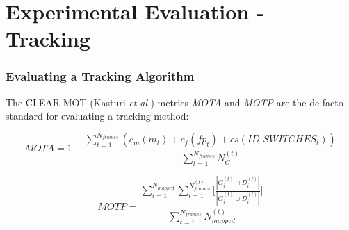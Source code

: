 \section{Experimental Evaluation - Tracking}

\begin{frame}
	\frametitle{Evaluating a Tracking Algorithm}
	
	\Large
	
	\vspace{0.3cm}
	
	The CLEAR MOT (Kasturi \emph{et al.}) metrics \emph{MOTA} and \emph{MOTP} are the de-facto
	standard for evaluating a tracking method:
	
	\vspace{0.2cm}
	
	\large
	
	\begin{equation*}
		MOTA = 1 - \frac{\sum_{t=1}^{N_{frames}} (c_m(m_t) + c_f(fp_t) + cs(ID\mbox{-}SWITCHES_t))}{\sum_{t=1}^{N_{frames}} N_G^{(t)}}
	\end{equation*}
	
	\vspace{0.4cm}
	
	\begin{equation*}
		MOTP = \frac{\sum_{i=1}^{N_{mapped}} \sum_{t=1}^{N_{frames}^{(t)}} \Big [ \frac{| G_i^{(t)} \cap D_i^{(t)} |}{| G_i^{(t)} \cup D_i^{(t)} |} \Big ] }{\sum_{t=1}^{N_{frames}} N_{mapped}^{(t)}}
	\end{equation*}
\end{frame}

